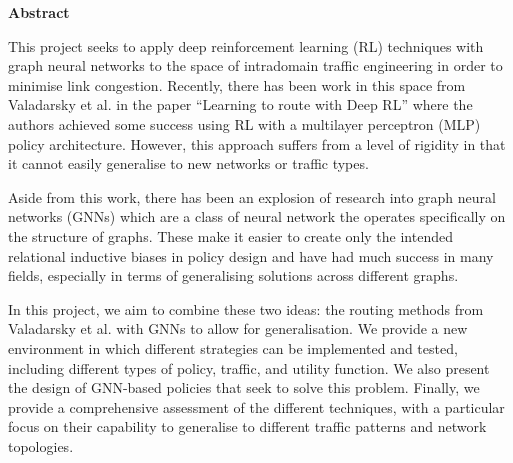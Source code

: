 \newpage
{\Huge \bf Abstract}
\vspace{24pt} 

This project seeks to apply deep reinforcement learning (RL) techniques with graph neural networks to the space of intradomain traffic engineering in order to minimise link congestion. Recently, there has been work in this space from Valadarsky et al. in the paper ``Learning to route with Deep RL'' where the authors achieved some success using RL with a multilayer perceptron (MLP) policy architecture. However, this approach suffers from a level of rigidity in that it cannot easily generalise to new networks or traffic types.

Aside from this work, there has been an explosion of research into graph neural networks (GNNs) which are a class of neural network the operates specifically on the structure of graphs. These make it easier to create only the intended relational inductive biases in policy design and have had much success in many fields, especially in terms of generalising solutions across different graphs.

In this project, we aim to combine these two ideas: the routing methods from Valadarsky et al. with GNNs to allow for generalisation. We provide a new environment in which different strategies can be implemented and tested, including different types of policy, traffic, and utility function. We also present the design of GNN-based policies that seek to solve this problem. Finally, we provide a comprehensive assessment of the different techniques, with a particular focus on their capability to generalise to different traffic patterns and network topologies.

\newpage
\vspace*{\fill}
